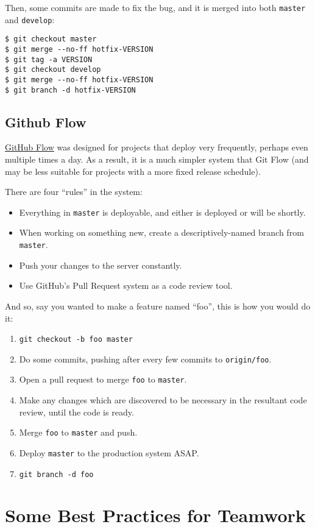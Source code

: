 \documentclass[12pt,a4paper]{article}
\begin{document}
Then, some commits are made to fix the bug, and it is merged into both
\texttt{master} and \texttt{develop}:

\begin{verbatim}
$ git checkout master
$ git merge --no-ff hotfix-VERSION
$ git tag -a VERSION
$ git checkout develop
$ git merge --no-ff hotfix-VERSION
$ git branch -d hotfix-VERSION
\end{verbatim}

\subsection{Github Flow}

\href{http://scottchacon.com/2011/08/31/github-flow.html}{GitHub Flow}
was designed for projects that deploy very frequently, perhaps even
multiple times a day. As a result, it is a much simpler system that
Git Flow (and may be less suitable for projects with a more fixed
release schedule).

There are four ``rules'' in the system:

\begin{itemize}
  \item Everything in \texttt{master} is deployable, and either is
    deployed or will be shortly.
  \item When working on something new, create a descriptively-named
    branch from \texttt{master}.
  \item Push your changes to the server constantly.
  \item Use GitHub's Pull Request system as a code review tool.
\end{itemize}

And so, say you wanted to make a feature named ``foo'', this is how
you would do it:

\begin{enumerate}
  \item \texttt{git checkout -b foo master}
  \item Do some commits, pushing after every few commits to
    \texttt{origin/foo}.
  \item Open a pull request to merge \texttt{foo} to \texttt{master}.
  \item Make any changes which are discovered to be necessary in the
    resultant code review, until the code is ready.
  \item Merge \texttt{foo} to \texttt{master} and push.
  \item Deploy \texttt{master} to the production system ASAP.
  \item \texttt{git branch -d foo}
\end{enumerate}

\section{Some Best Practices for Teamwork}
\end{document}
